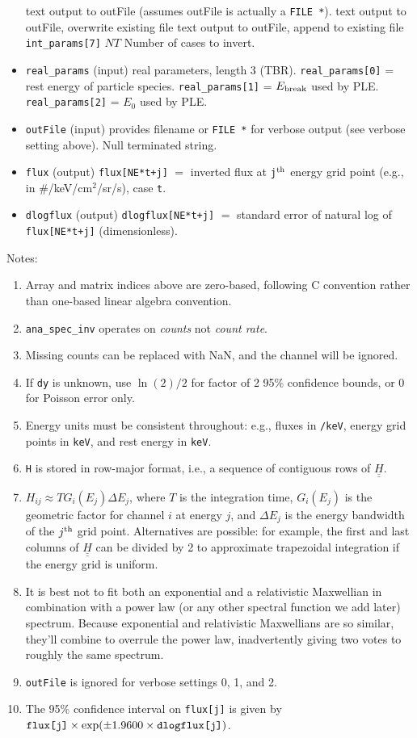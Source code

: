 \documentclass{article}    %
\newcommand{\dbul}[1]{\underline{\underline{#1}}}
\begin{document}
\begin{itemize}
\subsubitem[3] text output to outFile (assumes outFile is actually a \verb|FILE *|).
\subsubitem[4] text output to outFile, overwrite existing file
\subsubitem[5] text output to outFile, append to existing file
\subitem \verb|int_params[7]| $NT$ Number of cases to invert.
\item \verb|real_params| (input) real parameters, length 3 (TBR).
\subitem \verb|real_params[0]| = rest energy of particle species.
\subitem \verb|real_params[1]| = $E_{\rm break}$ used by PLE.
\subitem \verb|real_params[2]| = $E_0$ used by PLE.
\item \verb|outFile| (input) provides filename or \verb|FILE *| for verbose output (see verbose setting above). Null terminated string.
\item \verb|flux| (output) \verb|flux[NE*t+j]| $=$ inverted flux at \verb|j|$^{\rm th}$ energy grid point (e.g., in \#/keV/cm$^2$/sr/s), case \verb|t|.
\item \verb|dlogflux| (output) \verb|dlogflux[NE*t+j]| $=$ standard error of natural log of \verb|flux[NE*t+j]| (dimensionless).
\end{itemize}

Notes: 
\begin{enumerate}
\item Array and matrix indices above are zero-based, following C convention rather than one-based linear algebra convention.
\item \verb|ana_spec_inv| operates on {\it counts} not {\it count rate}.
\item Missing counts can be replaced with NaN, and the channel will be ignored.
\item If \verb|dy| is unknown, use $\ln(2)/2$ for factor of 2 95\% confidence bounds, or 0 for Poisson error only.
\item Energy units must be consistent throughout: e.g., fluxes in \verb|/keV|, energy grid points in \verb|keV|, and rest energy in \verb|keV|.
\item \verb|H| is stored in row-major format, i.e., a sequence of contiguous rows of $\dbul{H}$.
\item $H_{ij} \approx T G_i(E_j)\Delta E_j$, where $T$ is the
  integration time, $G_i(E_j)$ is the geometric factor for channel $i$
  at energy $j$, and $\Delta E_j$ is the energy bandwidth of the
  $j^{\rm th}$ grid point. Alternatives are possible:  for example,
  the first and last columns of $\dbul{H}$ can be divided by 2 to
  approximate trapezoidal integration if the energy grid is uniform.
\item It is best not to fit both an exponential and a relativistic
  Maxwellian in combination with a power law (or any other spectral
  function we add later) spectrum. Because exponential and
  relativistic Maxwellians are so similar, they'll combine to overrule
  the power law, inadvertently giving two votes to roughly the same
  spectrum.
\item \verb|outFile| is ignored for verbose settings 0, 1, and 2.
\item The 95\% confidence interval on \verb|flux[j]| is given by $\verb|flux[j]|\times\exp(\pm 1.9600\times\verb|dlogflux[j]|)$.
\end{enumerate}
\end{document}
